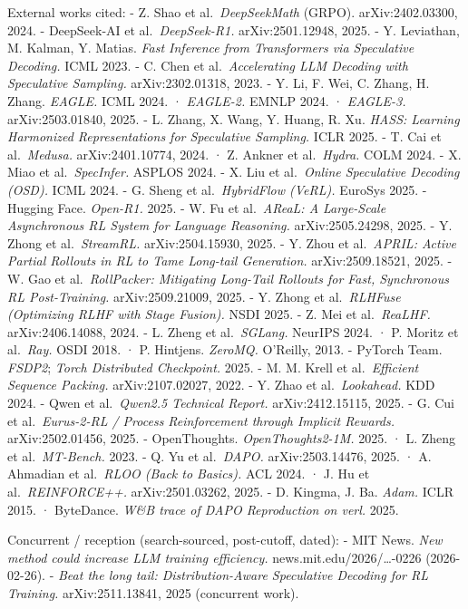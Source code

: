 \documentclass[
  11pt,
  letterpaper,
]{article}
\begin{document}
External works cited: - Z. Shao et al.~\emph{DeepSeekMath} (GRPO).
arXiv:2402.03300, 2024. - DeepSeek-AI et al.~\emph{DeepSeek-R1.}
arXiv:2501.12948, 2025. - Y. Leviathan, M. Kalman, Y. Matias. \emph{Fast
Inference from Transformers via Speculative Decoding.} ICML 2023. - C.
Chen et al.~\emph{Accelerating LLM Decoding with Speculative Sampling.}
arXiv:2302.01318, 2023. - Y. Li, F. Wei, C. Zhang, H. Zhang.
\emph{EAGLE.} ICML 2024. · \emph{EAGLE-2.} EMNLP 2024. · \emph{EAGLE-3.}
arXiv:2503.01840, 2025. - L. Zhang, X. Wang, Y. Huang, R. Xu.
\emph{HASS: Learning Harmonized Representations for Speculative
Sampling.} ICLR 2025. - T. Cai et al.~\emph{Medusa.} arXiv:2401.10774,
2024. · Z. Ankner et al.~\emph{Hydra.} COLM 2024. - X. Miao et
al.~\emph{SpecInfer.} ASPLOS 2024. - X. Liu et al.~\emph{Online
Speculative Decoding (OSD).} ICML 2024. - G. Sheng et
al.~\emph{HybridFlow (VeRL).} EuroSys 2025. - Hugging Face.
\emph{Open-R1.} 2025. - W. Fu et al.~\emph{AReaL: A Large-Scale
Asynchronous RL System for Language Reasoning.} arXiv:2505.24298, 2025.
- Y. Zhong et al.~\emph{StreamRL.} arXiv:2504.15930, 2025. - Y. Zhou et
al.~\emph{APRIL: Active Partial Rollouts in RL to Tame Long-tail
Generation.} arXiv:2509.18521, 2025. - W. Gao et al.~\emph{RollPacker:
Mitigating Long-Tail Rollouts for Fast, Synchronous RL Post-Training.}
arXiv:2509.21009, 2025. - Y. Zhong et al.~\emph{RLHFuse (Optimizing RLHF
with Stage Fusion).} NSDI 2025. - Z. Mei et al.~\emph{ReaLHF.}
arXiv:2406.14088, 2024. - L. Zheng et al.~\emph{SGLang.} NeurIPS 2024. ·
P. Moritz et al.~\emph{Ray.} OSDI 2018. · P. Hintjens. \emph{ZeroMQ.}
O'Reilly, 2013. - PyTorch Team. \emph{FSDP2}; \emph{Torch Distributed
Checkpoint.} 2025. - M. M. Krell et al.~\emph{Efficient Sequence
Packing.} arXiv:2107.02027, 2022. - Y. Zhao et al.~\emph{Lookahead.} KDD
2024. - Qwen et al.~\emph{Qwen2.5 Technical Report.} arXiv:2412.15115,
2025. - G. Cui et al.~\emph{Eurus-2-RL / Process Reinforcement through
Implicit Rewards.} arXiv:2502.01456, 2025. - OpenThoughts.
\emph{OpenThoughts2-1M.} 2025. · L. Zheng et al.~\emph{MT-Bench.} 2023.
- Q. Yu et al.~\emph{DAPO.} arXiv:2503.14476, 2025. · A. Ahmadian et
al.~\emph{RLOO (Back to Basics).} ACL 2024. · J. Hu et
al.~\emph{REINFORCE++.} arXiv:2501.03262, 2025. - D. Kingma, J. Ba.
\emph{Adam.} ICLR 2015. · ByteDance. \emph{W\&B trace of DAPO
Reproduction on verl.} 2025.

Concurrent / reception (search-sourced, post-cutoff, dated): - MIT News.
\emph{New method could increase LLM training efficiency.}
news.mit.edu/2026/\ldots-0226 (2026-02-26). - \emph{Beat the long tail:
Distribution-Aware Speculative Decoding for RL Training.}
arXiv:2511.13841, 2025 (concurrent work).
\end{document}
